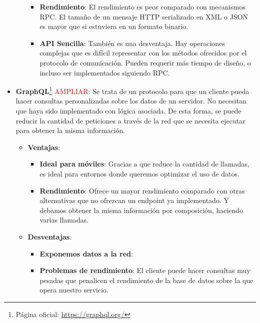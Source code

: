 \begin{itemize}
\begin{itemize}
    \begin{itemize}
      \item \textbf{Rendimiento}: El rendimiento es peor comparado con mecanismos RPC. El tamaño de un mensaje HTTP serializado en XML o JSON es mayor que si estuviera en un formato binario.

      \item \textbf{API Sencilla}: También es una desventaja. Hay operaciones complejas que es difícil representar con los métodos ofrecidos por el protocolo de comunicación. Pueden requerir más tiempo de diseño, o incluso ser implementados siguiendo RPC.
    \end{itemize}
  \end{itemize}

  \item \textbf{GraphQL}\footnote{Página oficial: \url{https://graphql.org/}} \textcolor{red}{AMPLIAR}: Se trata de un protocolo para que un cliente pueda hacer consultas personalizadas sobre los datos de un servidor. No necesitan que haya sido implementado con lógica asociada. De esta forma, se puede reducir la cantidad de peticiones a través de la red que se necesita ejecutar para obtener la misma información.

  \begin{itemize}
    \item \textbf{Ventajas}:

    \begin{itemize}
      \item \textbf{Ideal para móviles}: Gracias a que reduce la cantidad de llamadas, es ideal para entornos donde queremos optimizar el uso de datos.

      \item \textbf{Rendimiento}: Ofrece un mayor rendimiento comparado con otras alternativas que no ofrezcan un endpoint ya implementado. Y debamos obtener la misma información por composición, haciendo varias llamadas.
    \end{itemize}

    \item \textbf{Desventajas}:

    \begin{itemize}
      \item \textbf{Exponemos datos a la red}:

      \item \textbf{Problemas de rendimiento}: El cliente puede hacer consultas muy pesadas que penalicen el rendimiento de la base de datos sobre la que opera nuestro servicio.
    \end{itemize}
  \end{itemize}


\end{itemize}
